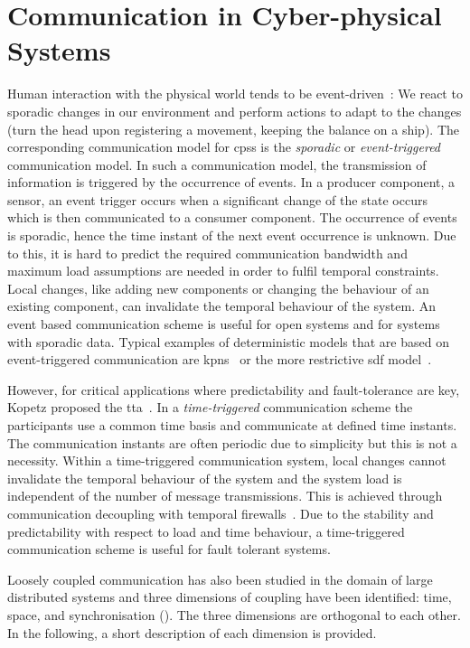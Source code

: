 \section{Communication in Cyber-physical Systems}
\label{sect_background_com}
Human interaction with the physical world tends to be event-driven~\cite{tan2008}:
We react to sporadic changes in our environment and perform actions to adapt to the changes (turn the head upon registering a movement, keeping the balance on a ship).
The corresponding communication model for \glspl{cps} is the \emph{sporadic} or \emph{event-triggered} communication model.
In such a communication model, the transmission of information is triggered by the occurrence of events.
In a producer component, \ie a sensor, an event trigger occurs when a significant change of the state occurs which is then communicated to a consumer component.
The occurrence of events is sporadic, hence the time instant of the next event occurrence is unknown.
Due to this, it is hard to predict the required communication bandwidth and maximum load assumptions are needed in order to fulfil temporal constraints.
Local changes, like adding new components or changing the behaviour of an existing component, can invalidate the temporal behaviour of the system.
An event based communication scheme is useful for open systems and for systems with sporadic data.
Typical examples of deterministic models that are based on event-triggered communication are \glspl{kpn}~\cite{kahn1974} or the more restrictive \gls{sdf} model~\cite{lee1987}.

However, for critical applications where predictability and fault-tolerance are key, Kopetz \etal proposed the \gls{tta}~\cite{kopetz2011c}.
In a {\em time-triggered} communication scheme the participants use a common time basis and communicate at defined time instants.
The communication instants are often periodic due to simplicity but this is not a necessity.
Within a time-triggered communication system, local changes cannot invalidate the temporal behaviour of the system and the system load is independent of the number of message transmissions.
This is achieved through communication decoupling with temporal firewalls~\cite{kopetz2002}.
Due to the stability and predictability with respect to load and time behaviour, a time-triggered communication scheme is useful for fault tolerant systems.

Loosely coupled communication has also been studied in the domain of large distributed systems and three dimensions of coupling have been identified: time, space, and synchronisation (\cite{eugster2003, aldred2005}).
The three dimensions are orthogonal to each other.
In the following, a short description of each dimension is provided.

